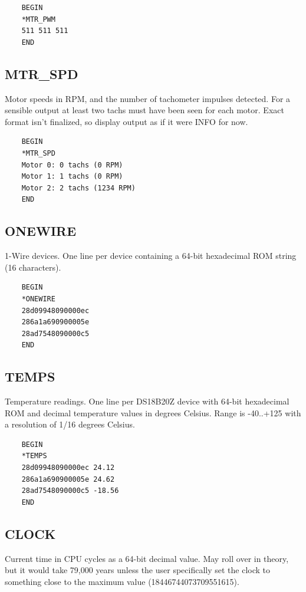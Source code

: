 \documentclass{article}
\begin{document}
\begin{lstlisting}
    BEGIN
    *MTR_PWM
    511 511 511
    END
\end{lstlisting}

\subsection{MTR\_SPD}

Motor speeds in RPM, and the number of tachometer impulses detected.
For a sensible output at least two tachs must have been seen for each motor.
Exact format isn't finalized, so display output as if it were INFO for now.

\begin{lstlisting}
    BEGIN
    *MTR_SPD
    Motor 0: 0 tachs (0 RPM)
    Motor 1: 1 tachs (0 RPM)
    Motor 2: 2 tachs (1234 RPM)
    END
\end{lstlisting}

\subsection{ONEWIRE}

1-Wire devices.
One line per device containing a 64-bit hexadecimal ROM string (16 characters).

\begin{lstlisting}
    BEGIN
    *ONEWIRE
    28d09948090000ec
    286a1a690900005e
    28ad7548090000c5
    END
\end{lstlisting}

\subsection{TEMPS}

Temperature readings.
One line per DS18B20Z device with 64-bit hexadecimal ROM and decimal temperature values in degrees Celsius.
Range is -40..+125 with a resolution of 1/16 degrees Celsius.

\begin{lstlisting}
    BEGIN
    *TEMPS
    28d09948090000ec 24.12
    286a1a690900005e 24.62
    28ad7548090000c5 -18.56
    END
\end{lstlisting}

\subsection{CLOCK}

Current time in CPU cycles as a 64-bit decimal value.
May roll over in theory, but it would take 79,000 years unless the user
specifically set the clock to something close to the maximum value (18446744073709551615).
\end{document}
